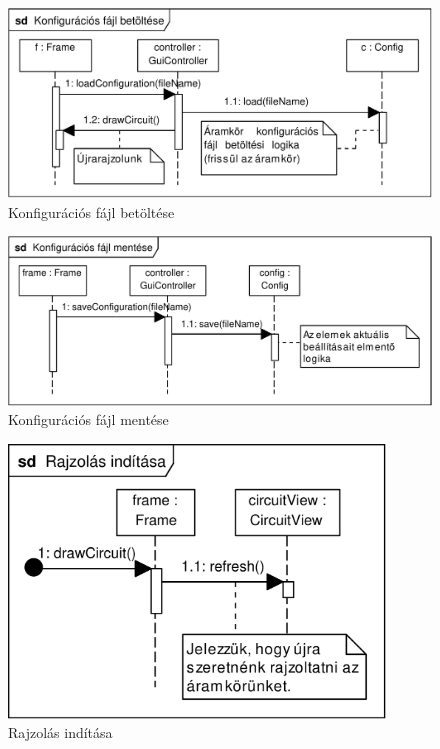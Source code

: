 \begin{figure}[h]
\begin{center}
\includegraphics[width=17cm]{chapters/chapter11/pdfs/3_loadconfig.pdf}
\caption{Konfigurációs fájl betöltése}
\label{fig:loadconfig}
\end{center}
\end{figure}

\begin{figure}[h]
\begin{center}
\includegraphics[width=17cm]{chapters/chapter11/pdfs/4_saveconfig.pdf}
\caption{Konfigurációs fájl mentése}
\label{fig:saveconfig}
\end{center}
\end{figure}

\begin{figure}[h]
\begin{center}
\includegraphics[width=10cm]{chapters/chapter11/pdfs/5_paint1.pdf}
\caption{Rajzolás indítása}
\label{fig:paint1}
\end{center}
\end{figure}

